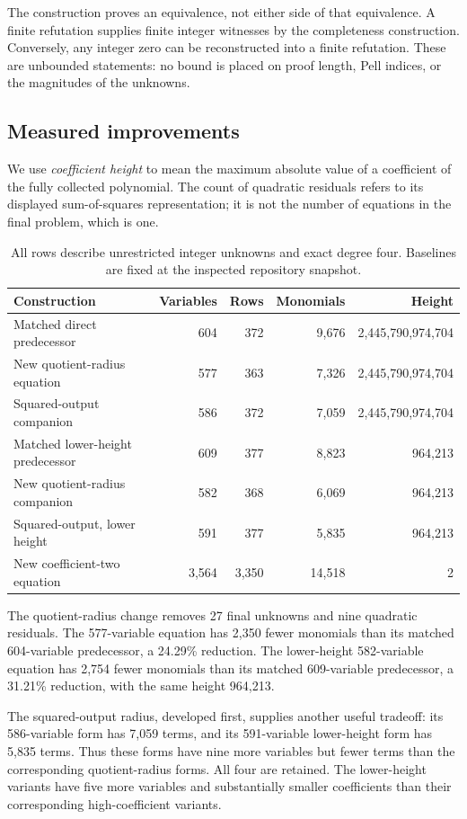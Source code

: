 The construction proves an equivalence, not either side of that equivalence. A finite refutation supplies finite integer witnesses by the completeness construction. Conversely, any integer zero can be reconstructed into a finite refutation. These are unbounded statements: no bound is placed on proof length, Pell indices, or the magnitudes of the unknowns.

\subsection{Measured improvements}

We use \emph{coefficient height} to mean the maximum absolute value of a coefficient of the fully collected polynomial. The count of quadratic residuals refers to its displayed sum-of-squares representation; it is not the number of equations in the final problem, which is one.

\begin{table}[ht]
\centering\small
\begin{tabular}{lrrrr}
\toprule
Construction & Variables & Rows & Monomials & Height\\
\midrule
Matched direct predecessor &604&372&9,676&2,445,790,974,704\\
New quotient-radius equation &577&363&7,326&2,445,790,974,704\\
Squared-output companion &586&372&7,059&2,445,790,974,704\\
Matched lower-height predecessor &609&377&8,823&964,213\\
New quotient-radius companion &582&368&6,069&964,213\\
Squared-output, lower height &591&377&5,835&964,213\\
New coefficient-two equation &3,564&3,350&14,518&2\\
\bottomrule
\end{tabular}
\caption{All rows describe unrestricted integer unknowns and exact degree four. Baselines are fixed at the inspected repository snapshot.}
\end{table}

The quotient-radius change removes 27 final unknowns and nine quadratic residuals. The 577-variable equation has 2,350 fewer monomials than its matched 604-variable predecessor, a 24.29\% reduction. The lower-height 582-variable equation has 2,754 fewer monomials than its matched 609-variable predecessor, a 31.21\% reduction, with the same height 964,213.

The squared-output radius, developed first, supplies another useful tradeoff: its 586-variable form has 7,059 terms, and its 591-variable lower-height form has 5,835 terms. Thus these forms have nine more variables but fewer terms than the corresponding quotient-radius forms. All four are retained. The lower-height variants have five more variables and substantially smaller coefficients than their corresponding high-coefficient variants.

